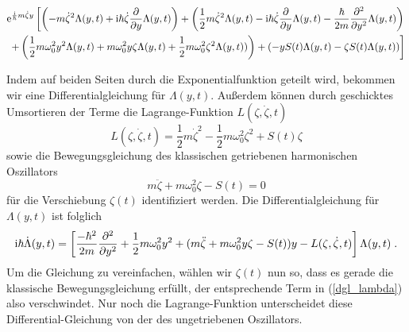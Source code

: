     \begin{align}
      \begin{split}
      \text e^{\frac{\text i}{\hbar}m\dot \zeta y} \left[\left(-m\dot \zeta^2 \Lambda(y,t) + \text i \hbar \dot \zeta \frac{\partial}{\partial y} \Lambda(y,t) \right) + \left(\frac{1}{2}m\dot \zeta^2 \Lambda(y,t) - \text{i} \hbar \dot \zeta \frac{\partial}{\partial y} \Lambda(y,t) - \frac{\hbar}{2m}\frac{\partial^2}{\partial y^2} \Lambda(y,t)  \right) \right. \\
      \left. + \left(\frac{1}{2}m\omega_0^2y^2\Lambda(y,t) + m\omega_0^2y\zeta\Lambda(y,t) + \frac{1}{2}m\omega_0^2 \zeta^2\Lambda(y,t)) \right) + \left(-yS(t)\Lambda(y,t) - \zeta S(t)\Lambda(y,t) \right) \right]
    \end{split}
    \end{align}
    \fi

    \newpage

    Indem auf beiden Seiten durch die Exponentialfunktion geteilt wird, bekommen wir eine Differentialgleichung für $\Lambda(y,t)$.
    Außerdem können durch geschicktes Umsortieren der Terme die Lagrange-Funktion $L(\zeta,\dot \zeta, t)$
    \begin{equation}
      L(\zeta,\dot \zeta, t) = \frac{1}{2}m\dot \zeta^2 - \frac{1}{2}m\omega_0^2\zeta^2 + S(t)\zeta
      \label{lagrange_zeta}
    \end{equation}
      sowie die Bewegungsgleichung des klassischen getriebenen harmonischen  Oszillators \cite{husimi}
      \begin{equation}
        m\ddot \zeta + m\omega_0^2\zeta - S(t) = 0
        \label{dgl_zeta}
      \end{equation}
    für die Verschiebung $\zeta(t)$ identifiziert werden.
    Die Differentialgleichung für $\Lambda(y,t)$ ist folglich
    \begin{equation}
      \text i \hbar \dot \Lambda(y,t) = \left[ \frac{-\hbar^2}{2m}\frac{\partial^2}{\partial y^2} + \frac{1}{2}m\omega_0^2y^2 + (m\ddot \zeta + m\omega_0^2y\zeta - S(t))y - L(\zeta,\dot \zeta, t) \right]\Lambda(y,t) \; .
      \label{dgl_lambda}
    \end{equation}
    Um die Gleichung zu vereinfachen, wählen wir $\zeta(t)$ nun so, dass es gerade die klassische Bewegungsgleichung erfüllt, der entsprechende Term in (\ref{dgl_lambda}) also verschwindet.
    Nur noch die Lagrange-Funktion unterscheidet diese Differential-Gleichung von der des ungetriebenen Oszillators.


